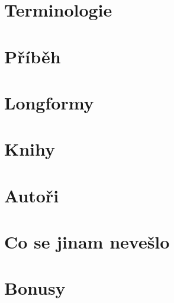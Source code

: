 \documentclass[a4paper,10pt,openany]{book}
\begin{document}
\label{:kategorie:fauly}
 
 

\chapter{Terminologie}\label{terminologie}
\label{:kategorie:terminologie}


\chapter{Příběh}




\chapter{Longformy}\label{longformy}




\chapter{Knihy}\label{knihy}



\chapter{Autoři}\label{autori}


\chapter{Co se jinam nevešlo}\label{co se jinam nevešlo}


\chapter{Bonusy}
\pagebreak
\end{document}
